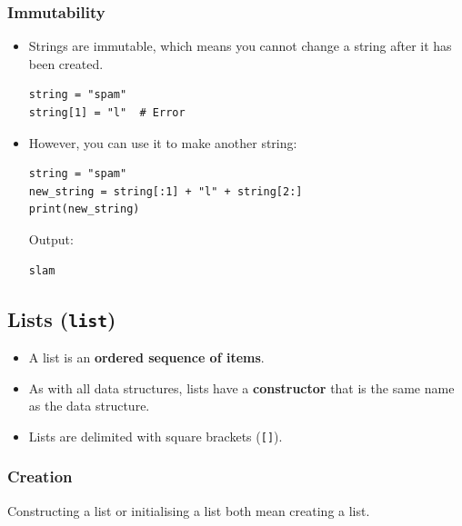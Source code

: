 \documentclass[11pt]{article}
\begin{document}
\subsubsection{Immutability}
\label{sec:orge9c6c06}
\begin{itemize}
\item Strings are immutable, which means you cannot change a string after it has been created.
\begin{verbatim}
string = "spam"
string[1] = "l"  # Error
\end{verbatim}

\item However, you can use it to make another string:
\begin{verbatim}
string = "spam"
new_string = string[:1] + "l" + string[2:]
print(new_string)
\end{verbatim}

 \noindent Output:

\begin{verbatim}
slam
\end{verbatim}
\end{itemize}

 \newpage

\subsection{Lists (\texttt{list})}
\label{sec:orgb8ec5d2}
\begin{itemize}
\item A list is an \textbf{ordered sequence of items}.
\item As with all data structures, lists have a \textbf{constructor} that is the same name as the data structure.
\item Lists are delimited with square brackets (\texttt{[]}).
\end{itemize}

\subsubsection{Creation}
\label{sec:org173dcea}
Constructing a list or initialising a list both mean creating a list.
\end{document}
